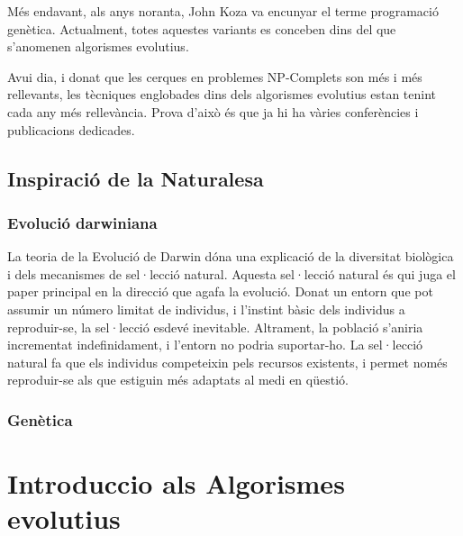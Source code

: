 \documentclass[a4paper]{article}
\begin{document}
Més endavant, als anys noranta, John Koza va encunyar el terme programació
genètica.  Actualment, totes aquestes variants es conceben dins del que
s'anomenen algorismes evolutius.


Avui dia, i donat que les cerques en problemes NP-Complets son més i més
rellevants, les tècniques englobades dins dels algorismes evolutius estan tenint
cada any més rellevància.  Prova d'això és que ja hi ha vàries conferències
i publicacions dedicades.

\subsection{Inspiració de la Naturalesa} %
\label{sub:Inspiracio de la Naturalesa}

\subsubsection{Evolució darwiniana} %
\label{ssub:Evolucio darwiniana}

La teoria de la Evolució de Darwin \cite{Darwin} dóna una explicació de la
diversitat biològica i dels mecanismes de sel·lecció natural.  Aquesta
sel·lecció natural és qui juga el paper principal en la direcció que agafa la
evolució.  Donat un entorn que pot assumir un número limitat de individus, i
l'instint bàsic dels individus a reproduir-se, la sel·lecció esdevé inevitable.
Altrament, la població s'aniria incrementat indefinidament, i l'entorn no podria
suportar-ho.  La sel·lecció natural fa que els individus competeixin pels
recursos existents, i permet només reproduir-se als que estiguin més adaptats al
medi en qüestió.

\subsubsection{Genètica} %
\label{ssub:Genetica}




\section{Introduccio als Algorismes evolutius} %
\label{sec:Introduccio als AE}

\end{document}
